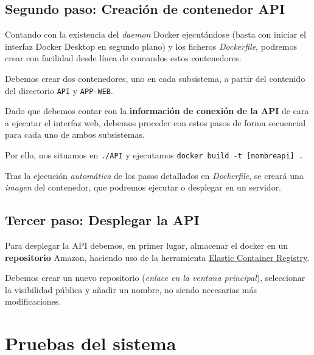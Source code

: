 
\subsection{Segundo paso: Creación de contenedor API}

Contando con la existencia del \textit{daemon} Docker ejecutándose (basta con iniciar el interfaz Docker Desktop en segundo plano) y los ficheros \textit{Dockerfile}, podremos crear con facilidad desde línea de comandos estos contenedores.

Debemos crear dos contenedores, uno en cada subsistema, a partir del contenido del directorio \texttt{API} y \texttt{APP-WEB}.

Dado que debemos contar con la \textbf{información de conexión de la API} de cara a ejecutar el interfaz web, debemos proceder con estos pasos de forma secuencial para cada uno de ambos subsistemas.

Por ello, nos situamos en \texttt{./API} y ejecutamos \texttt{docker build -t [nombreapi] .}

Tras la ejecución \textit{automática} de los pasos detallados en \textit{Dockerfile}, se creará una \textit{imagen} del contenedor, que podremos ejecutar o desplegar en un servidor.


\subsection{Tercer paso: Desplegar la API}

Para desplegar la API debemos, en primer lugar, almacenar el docker en un \textbf{repositorio} Amazon, haciendo uso de la herramienta \href{https://aws.amazon.com/es/ecr/}{Elastic Container Registry}.

Debemos crear un nuevo repositorio (\textit{enlace en la ventana principal}), seleccionar la visibilidad pública y añadir un nombre, no siendo necesarias más modificaciones.





\section{Pruebas del sistema}



